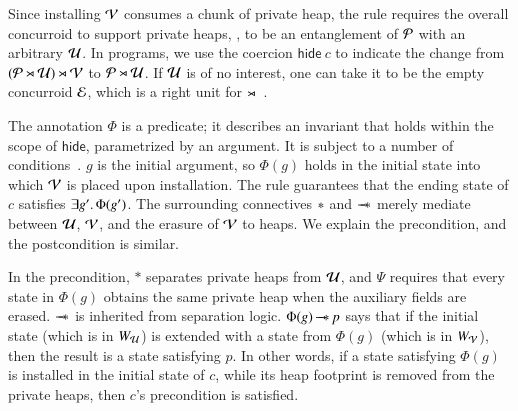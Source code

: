 %
%
Since installing $\mathcal{V}$ consumes a chunk of private heap, the rule
requires the overall concurroid to support private heaps, \ie, to be
an entanglement of $\mathcal{P}$ with an arbitrary $\mathcal{U}$. In programs,
we use the coercion $\mathsf{hide}\ c$ to indicate the change from
$(\mathcal{P} \rtimes {\mathcal{U}}) \rtimes {\mathcal{V}}$ to $\mathcal{P}
\rtimes \mathcal{U}$. If $\mathcal{U}$ is of no interest, one can take it to be
the empty concurroid $\mathcal{E}$, which is a right unit for
$\rtimes$~\cite[Appendix~B.4]{Sergey-al:ESOP15ext}.

The annotation $\Phi$ is a predicate; it describes an invariant that
holds within the scope of $\mathsf{hide}$, parametrized by an
argument. It is subject to a number of
conditions~\cite[Appendix~D.3]{Sergey-al:ESOP15ext}. $g$ is the
initial argument, so $\Phi(g)$ holds in the initial state into which
$\mathcal{V}$ is placed upon installation. The rule guarantees that the
ending state of $c$ satisfies $\exists g'\mathord{.}\, \Phi(g')$. The
surrounding connectives $\ast$ and $\mathop{-\!\!\!\!-\!\!\!\ast}$ merely mediate between
$\mathcal{U}$, $\mathcal{V}$, and the erasure of $\mathcal{V}$ to heaps. We explain the
precondition, and the postcondition is similar.

In the precondition, $*$ separates private heaps from $\mathcal{U}$, and
$\Psi$ requires that every state in $\Phi(g)$ obtains the same private
heap when the auxiliary fields are erased. $\mathop{-\!\!\!\!-\!\!\!\ast}$ is inherited from
separation logic. $\Phi(g) \mathop{-\!\!\!\!-\!\!\!\ast} p$ says that if the initial state
(which is in $W_{\mathcal{U}}$) is extended with a state from $\Phi(g)$
(which is in $W_{\mathcal{V}}$), then the result is a state satisfying
$p$. In other words, if a state satisfying $\Phi(g)$ is installed in
the initial state of $c$, while its heap footprint is removed from the
private heaps, then $c$'s precondition is satisfied.

